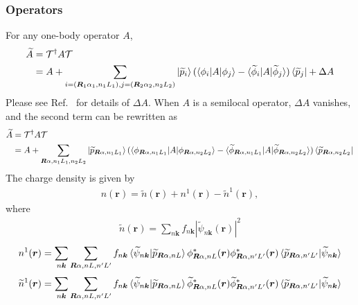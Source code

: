 \documentclass{article}
\begin{document}
\subsubsection{Operators}
For any one-body operator $A$, 
\begin{align}
  \widetilde{A} 
  &= \mathcal{T}^\dag A \mathcal{T}
  \\&=
  A + 
  \sum_{i = (\bm{R}_1\alpha_1,n_1L_1),j = (\bm{R}_2\alpha_2, n_2 L_2)}
  \ket{\widetilde{p}_i}
  (\braket{\phi_i | A | \phi_j} - 
  \braket{\widetilde{\phi}_i | A | \widetilde{\phi}_j})
  \bra{\widetilde{p}_j}
  + \Delta A
\end{align}
Please see Ref.~\cite{PhysRevB.50.17953} for details of $\Delta A$.
When $A$ is a semilocal operator, $\Delta A$ vanishes, and the second term can be rewritten as 
\begin{align}
  \widetilde{A} 
  &= \mathcal{T}^\dag A \mathcal{T}
  \\&=
  A + 
  \sum_{\bm{R}\alpha,n_1L_1, n_2 L_2}
  \ket{\widetilde{p}_{\bm{R}\alpha,n_1L_1}}
  (\braket{\phi_{\bm{R}\alpha,n_1L_1} | A | \phi_{\bm{R}\alpha,n_2L_2}} - 
  \braket{\widetilde{\phi}_{\bm{R}\alpha,n_1L_1} | A | \widetilde{\phi}_{\bm{R}\alpha,n_2L_2}})
  \bra{\widetilde{p}_{\bm{R}\alpha,n_2L_2}}
\end{align}
The charge density is given by
\begin{align}
  n(\bm{r}) = \widetilde{n}(\bm{r}) + n^1(\bm{r}) - \widetilde{n}^1(\bm{r}),
\end{align}
where
\begin{align}
\widetilde{n}(\bm{r}) =  \sum_{n\bm{k}} f_{n\bm{k}} |\widetilde{\psi}_{n\bm{k}}(\bm{r})|^2 
\end{align}
\begin{align}
  {n}^1(\bm{r}) =  \sum_{n\bm{k}} \sum_{\bm{R}\alpha, nL, n'L'} f_{n\bm{k}} 
  \braket{\widetilde{\psi}_{n\bm{k}} | \widetilde{p}_{\bm{R}\alpha, nL}} 
  \phi^*_{\bm{R}\alpha, nL}(\bm{r})
  \phi^*_{\bm{R}\alpha, n'L'}(\bm{r})
  \braket{ \widetilde{p}_{\bm{R}\alpha, n'L'} | \widetilde{\psi}_{n\bm{k}} } 
\end{align}
\begin{align}
  \widetilde{n}^1(\bm{r}) =  \sum_{n\bm{k}} \sum_{\bm{R}\alpha, nL, n'L'} f_{n\bm{k}} 
  \braket{\widetilde{\psi}_{n\bm{k}} | \widetilde{p}_{\bm{R}\alpha, nL}} 
  \widetilde{\phi}^*_{\bm{R}\alpha, nL}(\bm{r})
  \widetilde{\phi}^*_{\bm{R}\alpha, n'L'}(\bm{r})
  \braket{ \widetilde{p}_{\bm{R}\alpha, n'L'} | \widetilde{\psi}_{n\bm{k}} } 
\end{align}
\end{document}
